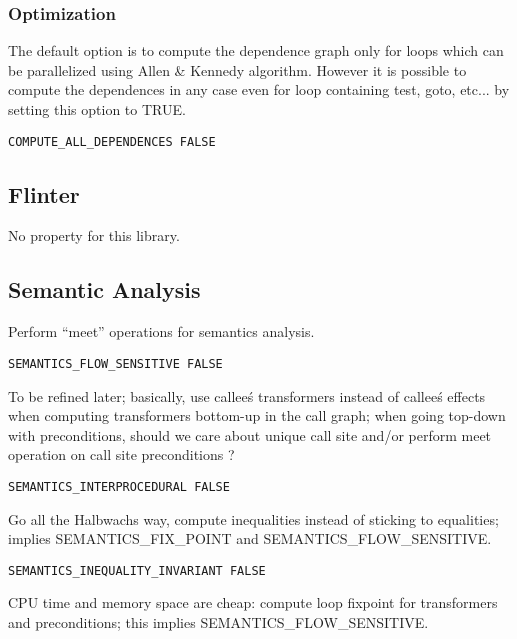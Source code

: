 \subsubsection{Optimization}

The default option is to compute the dependence graph only for loops
which can be parallelized using Allen \& Kennedy algorithm.
However it is possible to
compute the dependences in any case even for loop containing test, goto,
etc...
by setting this option to TRUE.

\begin{verbatim}
COMPUTE_ALL_DEPENDENCES FALSE
\end{verbatim}

\subsection{Flinter}

No property for this library.

\subsection{Semantic Analysis}
\label{subsection-semantic-analysis}

Perform ``meet'' operations for semantics analysis.

\begin{verbatim}
SEMANTICS_FLOW_SENSITIVE FALSE
\end{verbatim}

To be refined later; basically, use callee\'s transformers instead of
callee\'s effects when computing transformers bottom-up in the call graph;
when going top-down with preconditions, should we care about unique
call site and/or perform meet operation on call site preconditions ?

\begin{verbatim}
SEMANTICS_INTERPROCEDURAL FALSE
\end{verbatim}

Go all the Halbwachs way, compute inequalities instead of sticking
to equalities; implies SEMANTICS\_FIX\_POINT and SEMANTICS\_FLOW\_SENSITIVE.

\begin{verbatim}
SEMANTICS_INEQUALITY_INVARIANT FALSE
\end{verbatim}

CPU time and memory space are cheap: compute loop fixpoint for
transformers and preconditions; this implies SEMANTICS\_FLOW\_SENSITIVE.


